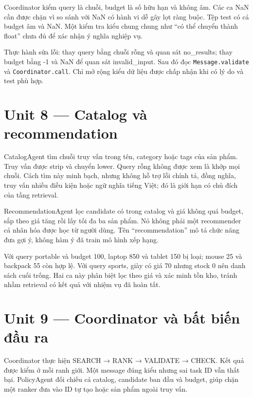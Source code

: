 Coordinator kiểm query là chuỗi, budget là số hữu hạn và không âm. Các
ca NaN cần được chặn vì so sánh với NaN có hành vi dễ gây lọt ràng buộc.
Tệp test có cả budget âm và NaN. Một kiểm tra kiểu chung chung như ``có
thể chuyển thành float'' chưa đủ để xác nhận ý nghĩa nghiệp vụ.

Thực hành sửa lỗi: thay query bằng chuỗi rỗng và quan sát no\_results;
thay budget bằng -1 và NaN để quan sát invalid\_input. Sau đó đọc
\passthrough{\lstinline!Message.validate!} và
\passthrough{\lstinline!Coordinator.call!}. Chỉ mở rộng kiểu dữ liệu
được chấp nhận khi có lý do và test phù hợp.

\section{Unit 8 --- Catalog và
recommendation}\label{unit-8-catalog-vuxe0-recommendation}

CatalogAgent tìm chuỗi truy vấn trong tên, category hoặc tags của sản
phẩm. Truy vấn được strip và chuyển lower. Query rỗng không được xem là
khớp mọi chuỗi. Cách tìm này minh bạch, nhưng không hỗ trợ lỗi chính tả,
đồng nghĩa, truy vấn nhiều điều kiện hoặc ngữ nghĩa tiếng Việt; đó là
giới hạn có chủ đích của tầng retrieval.

RecommendationAgent lọc candidate có trong catalog và giá không quá
budget, sắp theo giá tăng rồi lấy tối đa ba sản phẩm. Nó không phải một
recommender cá nhân hóa được học từ người dùng. Tên ``recommendation''
mô tả chức năng đưa gợi ý, không hàm ý đã train mô hình xếp hạng.

Với query portable và budget 100, laptop 850 và tablet 150 bị loại;
mouse 25 và backpack 55 còn hợp lệ. Với query sports, giày có giá 70
nhưng stock 0 nên danh sách cuối trống. Hai ca này phân biệt lọc theo
giá và xác minh tồn kho, tránh nhầm retrieval có kết quả với nhiệm vụ đã
hoàn tất.

\section{Unit 9 --- Coordinator và bất biến đầu
ra}\label{unit-9-coordinator-vuxe0-bux1ea5t-biux1ebfn-ux111ux1ea7u-ra}

Coordinator thực hiện SEARCH → RANK → VALIDATE → CHECK. Kết quả được
kiểm ở mỗi ranh giới. Một message đúng kiểu nhưng sai task ID vẫn thất
bại. PolicyAgent đối chiếu cả catalog, candidate ban đầu và budget, giúp
chặn một ranker đưa vào ID tự tạo hoặc sản phẩm ngoài truy vấn.

